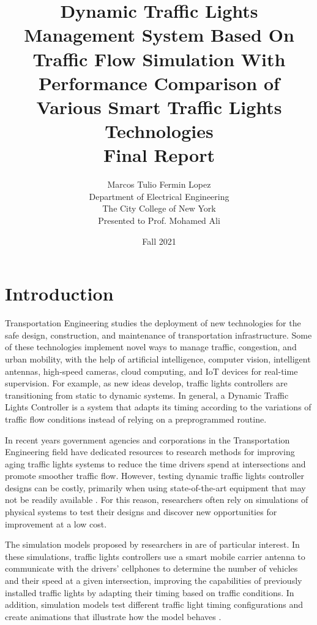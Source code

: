 \documentclass[12pt, a4paper,titlepage]{article}
\title{Dynamic Traffic Lights Management System Based On Traffic Flow Simulation With Performance Comparison of Various Smart Traffic Lights Technologies \vspace{1cm}\\Final Report}
\author{Marcos Tulio Fermin Lopez\\Department of Electrical Engineering\\The City College of New York \vspace{2cm}\\Presented to Prof. Mohamed Ali}
\date{Fall 2021}
\begin{document}
\maketitle
\newpage

\tableofcontents
\newpage
\section{Introduction}
\label{sec_intro}

Transportation Engineering studies the deployment of new technologies for the safe design, construction, and maintenance of transportation infrastructure. Some of these technologies implement novel ways to manage traffic, congestion, and urban mobility, with the help of artificial intelligence, computer vision, intelligent antennas, high-speed cameras, cloud computing, and IoT devices for real-time supervision. For example, as new ideas develop, traffic lights controllers are transitioning from static to dynamic systems. In general, a Dynamic Traffic Lights Controller is a system that adapts its timing according to the variations of traffic flow conditions instead of relying on a preprogrammed routine. 

In recent years government agencies and corporations in the Transportation Engineering field have dedicated resources to research methods for improving aging traffic lights systems to reduce the time drivers spend at intersections and promote smoother traffic flow. However, testing dynamic traffic lights controller designs can be costly, primarily when using state-of-the-art equipment that may not be readily available \cite{Jin17}. For this reason, researchers often rely on simulations of physical systems to test their designs and discover new opportunities for improvement at a low cost.
 
The simulation models proposed by researchers in \cite{Joyo20,Yaqub20} are of particular interest. In these simulations, traffic lights controllers use a smart mobile carrier antenna to communicate with the drivers' cellphones to determine the number of vehicles and their speed at a given intersection, improving the capabilities of previously installed traffic lights by adapting their timing based on traffic conditions.  In addition, simulation models test different traffic light timing configurations and create animations that illustrate how the model behaves \cite{Kamran17}.
\end{document}
